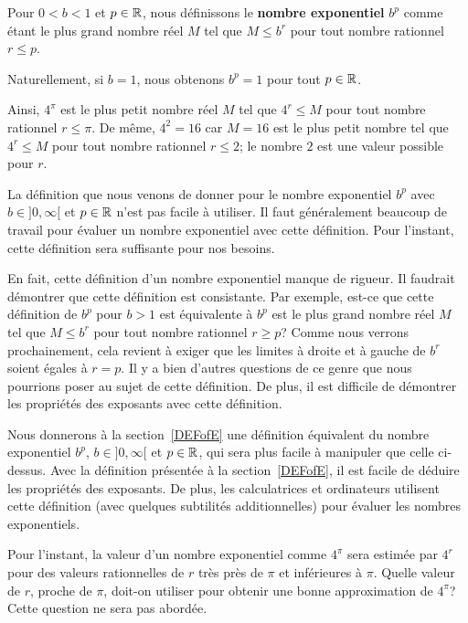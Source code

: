 {\begin{defn}
Pour $0<b<1$ et $p \in \mathbb{R}$, nous définissons le {\bfseries nombre exponentiel}
$b^p$ comme étant le plus grand nombre réel $M$ tel que $M \leq  b^r$
pour tout nombre rationnel $r\leq p$.

Naturellement, si $b=1$, nous obtenons $b^p = 1$ pour tout $p\in \mathbb{R}$.
\end{defn}


Ainsi, $4^\pi$ est le plus petit nombre réel $M$ tel que $4^r \leq M$
pour tout nombre rationnel $r\leq \pi$.  De même, $4^2 = 16$ car
$M=16$ est le plus petit nombre tel que $4^r \leq M$ pour tout nombre
rationnel $r\leq 2$; le nombre $2$ est une valeur possible pour $r$. 

La définition que nous venons de donner pour le nombre exponentiel
$b^p$ avec $b\in]0,\infty[$ et $p\in \mathbb{R}$ n'est pas facile à utiliser.
Il faut généralement beaucoup de travail pour évaluer un nombre
exponentiel avec cette définition.  Pour l'instant, cette définition
sera suffisante pour nos besoins.

En fait, cette définition d'un nombre exponentiel manque de rigueur.
Il faudrait démontrer que cette définition est consistante.  Par
exemple, est-ce que cette définition de $b^p$ pour $b>1$ est
équivalente à \lgm $b^p$ est le plus grand nombre réel $M$ tel que $M
\leq  b^r$ pour tout nombre rationnel $r\geq p$\rgm ?  Comme nous verrons 
prochainement, cela revient à exiger que les limites à droite et à
gauche de $b^r$ soient égales à $r=p$.  Il y a bien d'autres questions
de ce genre que nous pourrions poser au sujet de cette définition.  
De plus, il est difficile de démontrer les propriétés des exposants
avec cette définition.

Nous donnerons à la section~\ref{DEFofE} une définition équivalent du
nombre exponentiel $b^p$, $b\in]0,\infty[$ et $p\in \mathbb{R}$, qui sera
plus facile à manipuler que celle ci-dessus.  Avec la définition
présentée à la section~\ref{DEFofE}, il est facile de déduire les
propriétés des exposants.  De plus, les calculatrices et ordinateurs
utilisent cette définition (avec quelques subtilités additionnelles)
pour évaluer les nombres exponentiels.

Pour l'instant, la valeur d'un nombre exponentiel comme $4^\pi$ sera estimée
par $4^r$ pour des valeurs rationnelles de $r$ très près de $\pi$ et
inférieures à $\pi$.  Quelle valeur de $r$, proche de $\pi$, doit-on
utiliser pour obtenir une bonne approximation de $4^\pi$?  Cette
question ne sera pas abordée.

}
